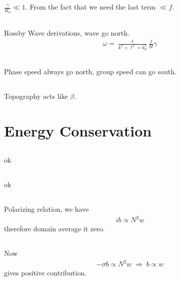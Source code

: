 \documentclass[11pt,letterpaper]{book}
\theoremstyle{definition}
\newcommand{\dsp}{\displaystyle}
\begin{document}
\subsection{}
$\dsp{\frac{\gamma}{H_0}\ll 1}$. From the fact that we need the last term $\ll f$.

\subsection{}
Rossby Wave derivations, wave go north.
\begin{align*}
    \omega = \frac{\ell}{k^2+\ell^2+k_d^2}\frac{f}{H}\gamma
\end{align*}

\subsection{}
Phase speed always go north, group speed can go south.

\subsection{}
Topography acts like $\beta$.

\section{Energy Conservation}
\subsection{}
ok

\subsection{}
ok

\subsection{}
Polarizing relation, we have
\begin{align*}
    ib\propto N^2 w
\end{align*}
therefore domain average it zero.

\subsection{}
Now
\begin{align*}
    -\sigma b\propto N^2 w\;\Rightarrow\; b\propto w
\end{align*}
gives positive contribution.
\end{document}
